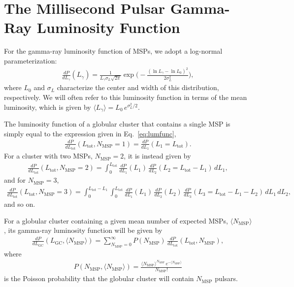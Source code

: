 \documentclass[a4paper,11pt]{article}
\begin{document}
\section{The Millisecond Pulsar Gamma-Ray Luminosity Function}
\label{sec:glf}

For the gamma-ray luminosity function of MSPs, we adopt a log-normal parameterization:
%
\begin{align}
\frac{dP}{dL_{\gamma}}(L_{\gamma}) = \frac{1}{L_{\gamma} \sigma_L \sqrt{2\pi}} \exp\bigg(-\frac{(\ln L_{\gamma} - \ln L_0)^2}{2 \sigma_L^2}\bigg),
\label{eq:lumfunc}
\end{align}
%
where $L_0$ and $\sigma_L$ characterize the center and width of this distribution, respectively. We will often refer to this luminosity function in terms of the mean luminosity, which is given by $\langle L_{\gamma} \rangle = L_0 \, e^{\sigma_L^2/2}$.

The luminosity function of a globular cluster that contains a single MSP is simply equal to the expression given in Eq.~\ref{eq:lumfunc},
%
\begin{align}
\frac{dP}{dL_\textrm{tot}} (L_\textrm{tot}, N_\textrm{MSP}=1) = \frac{dP}{dL_{1}}(L_1=L_\textrm{tot}). 
\end{align}
%
For a cluster with two MSPs, $N_\textrm{MSP}=2$, it is instead given by
%
\begin{align}
\frac{dP}{dL_\textrm{tot}}(L_\textrm{tot}, N_\textrm{MSP}=2) =  \int_0^{L_\textrm{tot}} \frac{dP}{dL_1}(L_1) \, \frac{dP}{dL_2}(L_2=L_\textrm{tot}-L_1) \, dL_1,
\end{align}
%
and for $N_\textrm{MSP}=3$,
%
\begin{align}
\frac{dP}{dL_\textrm{tot}}(L_\textrm{tot}, N_\textrm{MSP}=3)  = \int_0^{L_\textrm{tot}-L_1} \int_0^{L_\textrm{tot}} \frac{dP}{dL_1}(L_1) \, \frac{dP}{dL_2}(L_2) \,\frac{dP}{dL_3}(L_3=L_\textrm{tot}-L_1-L_2) \, dL_1 \, dL_2,
\end{align}
%
and so on.

For a globular cluster containing a given mean number of expected MSPs, $\langle N_\textrm{MSP}\rangle$, its gamma-ray luminosity function will be given by
%
\begin{align}
\frac{dP}{dL_\textrm{GC}}(L_\textrm{GC},\langle N_\textrm{MSP}\rangle)  = \sum_{N_\textrm{MSP}=0}^\infty P(N_\textrm{MSP}) \, \frac{dP}{dL_\textrm{tot}}(L_\textrm{tot}, N_\textrm{MSP}),
\label{eq:glf}
\end{align}
%
where 
%
\begin{align}
P(N_\textrm{MSP},\langle N_\textrm{MSP}\rangle)= \frac{\langle N_\textrm{MSP}\rangle^{N_\textrm{MSP}} \, e^{-\langle N_\textrm{MSP}\rangle}}{N_\textrm{MSP}!}
\end{align}
%
is the Poisson probability that the globular cluster will contain $N_\textrm{MSP}$ pulsars.
\end{document}
